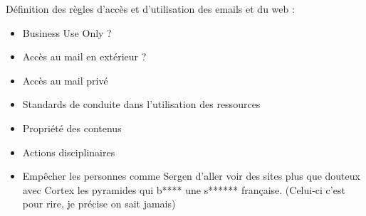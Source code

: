 \documentclass{report}
\begin{document}
Définition des règles d'accès et d'utilisation des emails et du web :

\begin{itemize}
    \item Business Use Only ?
    \item Accès au mail en extérieur ?
    \item Accès au mail privé
    \item Standards de conduite dans l'utilisation des ressources
    \item Propriété des contenus
    \item Actions disciplinaires
    \item Empêcher les personnes comme Sergen d'aller voir des sites plus que douteux avec Cortex les pyramides qui b**** une s****** française. (Celui-ci c'est pour rire, je précise on sait jamais)
\end{itemize}
\end{document}

